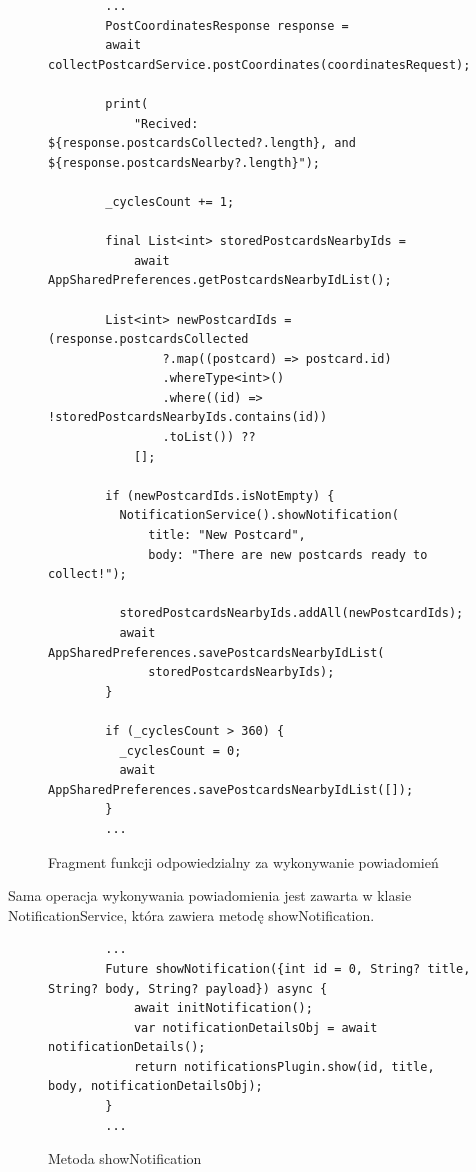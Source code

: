 \documentclass[a4paper,twoside,12pt]{book}
\begin{document}
\begin{figure}[H]
        \begin{lstlisting}
        ...
        PostCoordinatesResponse response =
        await collectPostcardService.postCoordinates(coordinatesRequest);

        print(
            "Recived: ${response.postcardsCollected?.length}, and ${response.postcardsNearby?.length}");
    
        _cyclesCount += 1;
    
        final List<int> storedPostcardsNearbyIds =
            await AppSharedPreferences.getPostcardsNearbyIdList();
    
        List<int> newPostcardIds = (response.postcardsCollected
                ?.map((postcard) => postcard.id)
                .whereType<int>()
                .where((id) => !storedPostcardsNearbyIds.contains(id))
                .toList()) ??
            [];
    
        if (newPostcardIds.isNotEmpty) {
          NotificationService().showNotification(
              title: "New Postcard",
              body: "There are new postcards ready to collect!");
    
          storedPostcardsNearbyIds.addAll(newPostcardIds);
          await AppSharedPreferences.savePostcardsNearbyIdList(
              storedPostcardsNearbyIds);
        }
    
        if (_cyclesCount > 360) {
          _cyclesCount = 0;
          await AppSharedPreferences.savePostcardsNearbyIdList([]);
        }
        ...
        \end{lstlisting}
    \caption{Fragment funkcji odpowiedzialny za wykonywanie powiadomień}
    \label{fig:pseudokod:listings}
    \end{figure}
Sama operacja wykonywania powiadomienia jest zawarta w klasie NotificationService, która zawiera metodę showNotification.
\begin{figure}[H]
        \begin{lstlisting}
        ...
        Future showNotification({int id = 0, String? title, String? body, String? payload}) async {
            await initNotification();
            var notificationDetailsObj = await notificationDetails();
            return notificationsPlugin.show(id, title, body, notificationDetailsObj);
        }
        ...
        \end{lstlisting}
    \caption{Metoda showNotification}
    \label{fig:pseudokod:listings}
    \end{figure}
\end{document}
